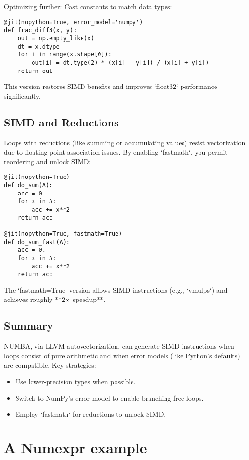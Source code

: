 \documentclass[11pt,a4paper]{book}
\begin{document}
Optimizing further: Cast constants to match data types:

\begin{lstlisting}
@jit(nopython=True, error_model='numpy')
def frac_diff3(x, y):
    out = np.empty_like(x)
    dt = x.dtype
    for i in range(x.shape[0]):
        out[i] = dt.type(2) * (x[i] - y[i]) / (x[i] + y[i])
    return out
\end{lstlisting}

This version restores SIMD benefits and improves `float32` performance significantly.

\section{SIMD and Reductions}

Loops with reductions (like summing or accumulating values) resist vectorization due to floating-point association issues. By enabling `fastmath`, you permit reordering and unlock SIMD:

\begin{lstlisting}
@jit(nopython=True)
def do_sum(A):
    acc = 0.
    for x in A:
        acc += x**2
    return acc

@jit(nopython=True, fastmath=True)
def do_sum_fast(A):
    acc = 0.
    for x in A:
        acc += x**2
    return acc
\end{lstlisting}

The `fastmath=True` version allows SIMD instructions (e.g., `vmulps`) and achieves roughly **2× speedup**.

\section*{Summary}

NUMBA, via LLVM autovectorization, can generate SIMD instructions when loops consist of pure arithmetic and when error models (like Python's defaults) are compatible. Key strategies:
\begin{itemize}
  \item Use lower-precision types when possible.
  \item Switch to NumPy’s error model to enable branching-free loops.
  \item Employ `fastmath` for reductions to unlock SIMD.
\end{itemize}

\chapter{A Numexpr example}
\end{document}
